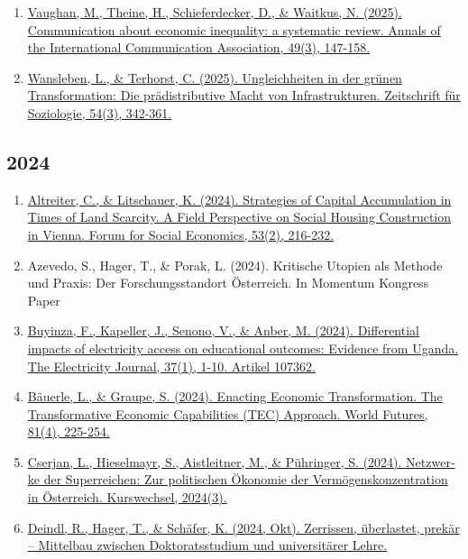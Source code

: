 \begin{enumerate}
	 \item \href{https://doi.org/10.1093/anncom/wlaf006}{Vaughan, M., Theine, H., Schieferdecker, D., \& Waitkus, N. (2025). Communication about economic inequality: a systematic review. Annals of the International Communication Association, 49(3), 147-158.}
	 \item \href{https://doi.org/10.1515/zfsoz-2025-2023}{Wansleben, L., \& Terhorst, C. (2025). Ungleichheiten in der grünen Transformation: Die prädistributive Macht von Infrastrukturen. Zeitschrift für Soziologie, 54(3), 342-361.}
\end{enumerate}
\subsection*{2024}
\begin{enumerate}
	 \item \href{https://doi.org/10.1080/07360932.2022.2125423}{Altreiter, C., \& Litschauer, K. (2024). Strategies of Capital Accumulation in Times of Land Scarcity. A Field Perspective on Social Housing Construction in Vienna. Forum for Social Economics, 53(2), 216-232.}
	 \item Azevedo, S., Hager, T., \& Porak, L. (2024). Kritische Utopien als Methode und Praxis: Der Forschungsstandort Österreich. In Momentum Kongress Paper
	 \item \href{https://doi.org/10.1016/j.tej.2023.107362}{Buyinza, F., Kapeller, J., Senono, V., \& Anber, M. (2024). Differential impacts of electricity access on educational outcomes: Evidence from Uganda. The Electricity Journal, 37(1), 1-10. Artikel 107362.}
	 \item \href{https://doi.org/10.1080/02604027.2024.2417040}{Bäuerle, L., \& Graupe, S. (2024). Enacting Economic Transformation. The Transformative Economic Capabilities (TEC) Approach. World Futures, 81(4), 225-254.}
	 \item \href{https://www.beigewum.at/kurswechsel/netzwerke-der-superreichen-zur-politischen-oekonomie-der-vermoegenskonzentration-in-oesterreich/}{Cserjan, L., Hieselmayr, S., Aistleitner, M., \& Pühringer, S. (2024). Netz­wer­ke der Super­rei­chen: Zur poli­ti­schen Öko­no­mie der Ver­mö­gens­kon­zen­tra­ti­on in Österreich. Kurswechsel, 2024(3).}
	 \item \href{https://www.oeh.ac.at/wp-content/uploads/2024/10/Vereinbarkeit_Katalog_fertig.pdf}{Deindl, R., Hager, T., \& Schäfer, K. (2024, Okt). Zerrissen, überlastet, prekär – Mittelbau zwischen Doktoratsstudium und universitärer Lehre.}

\end{enumerate}
